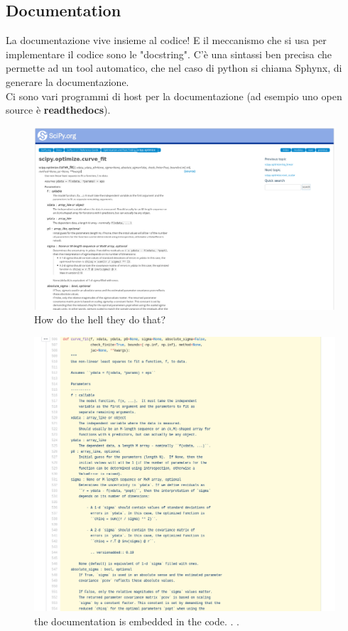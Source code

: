   
\subsection{Documentation}
La documentazione vive insieme al codice! E il meccanismo che si usa per implementare il codice sono le "docstring". C'è una sintassi ben precisa che permette ad un tool automatico, che nel caso di python si chiama Sphynx, di generare la documentazione.\\

Ci sono vari programmi di host per la documentazione (ad esempio uno open source è \textbf{readthedocs}).


\begin{figure}[ht]
    \centering
    \includegraphics[width=1\textwidth]{lez6/doc_scipy.png}
    \caption{How do the hell they do that?}
    \label{scipy_documentation}
\end{figure}
\FloatBarrier

\begin{figure}[ht]
    \centering
    \includegraphics[width=1\textwidth]{lez6/codice_doc.png}
    \caption{the documentation is embedded in the code. . .}
    \label{documentation_code}
\end{figure}
\FloatBarrier


